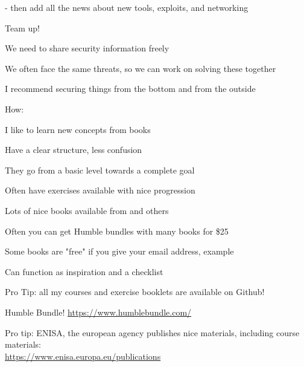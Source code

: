 \documentclass[Screen16to9,17pt]{foils}
\begin{document}
- then add all the news about new tools, exploits, and networking




\begin{list1}
\item Team up!
\item We need to share security information freely
\item We often face the same threats, so we can work on solving these together
\end{list1}





\centerline{I recommend securing things from the bottom and from the outside}



How:

I like to learn new concepts from books
\begin{list2}
\item Have a clear structure, less confusion
\item They go from a basic level towards a complete goal
\item Often have exercises available with nice progression
\item Lots of nice books available from  and others
\item Often you can get Humble bundles with many books for \$25
\item Some books are "free" if you give your email address, example
\item Can function as inspiration and a checklist
\end{list2}

Pro Tip: all my courses and exercise booklets are available on Github!

Humble Bundle! \url{https://www.humblebundle.com/}



Pro tip: ENISA, the european agency publishes nice materials, including course materials:\\
\url{https://www.enisa.europa.eu/publications}

\begin{quote}

\end{quote}
\end{document}
